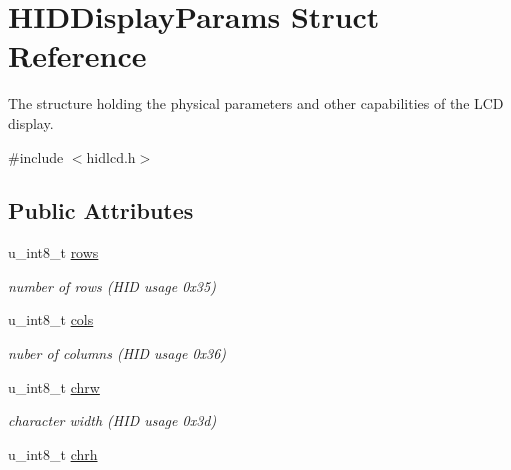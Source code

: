 \hypertarget{structHIDDisplayParams}{}\section{H\+I\+D\+Display\+Params Struct Reference}
\label{structHIDDisplayParams}


The structure holding the physical parameters and other capabilities of the L\+CD display.  




{\ttfamily \#include $<$hidlcd.\+h$>$}

\subsection*{Public Attributes}
\begin{DoxyCompactItemize}
\item 
\mbox{\label{structHIDDisplayParams_ac02cf815d6793fcb204a4bd5e29d88f4}} 
u\+\_\+int8\+\_\+t \hyperlink{structHIDDisplayParams_ac02cf815d6793fcb204a4bd5e29d88f4}{rows}
\begin{DoxyCompactList}\small\item\em number of rows (H\+ID usage 0x35) \end{DoxyCompactList}\item 
\mbox{\label{structHIDDisplayParams_a3e2253eabab0988dc4e59a1d3b942e5f}} 
u\+\_\+int8\+\_\+t \hyperlink{structHIDDisplayParams_a3e2253eabab0988dc4e59a1d3b942e5f}{cols}
\begin{DoxyCompactList}\small\item\em nuber of columns (H\+ID usage 0x36) \end{DoxyCompactList}\item 
\mbox{\label{structHIDDisplayParams_a6bdffe55995d3568816a4566e4f2674f}} 
u\+\_\+int8\+\_\+t \hyperlink{structHIDDisplayParams_a6bdffe55995d3568816a4566e4f2674f}{chrw}
\begin{DoxyCompactList}\small\item\em character width (H\+ID usage 0x3d) \end{DoxyCompactList}\item 
\mbox{\label{structHIDDisplayParams_a434991664d3cdcaac8a77b0140f1200b}} 
u\+\_\+int8\+\_\+t \hyperlink{structHIDDisplayParams_a434991664d3cdcaac8a77b0140f1200b}{chrh}

\end{DoxyCompactItemize}
